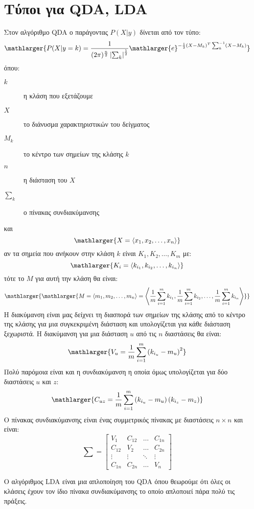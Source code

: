 \newpage
\section{Τύποι για \textlatin{QDA, LDA}}
Στον αλγόριθμο \textlatin{QDA} ο παράγοντας $P(X|y)$ δίνεται από τον τύπο:
$$\mathlarger{P(X|y=k)=\frac{1}{(2\pi)^\frac{n}{2}\left\lvert \sum_k\right\rvert^\frac{1}{2}}\mathlarger{e}^{-\frac{1}{2}(X-M_k)^T\sum_k^{-1}(X-M_k)}}$$
όπου:
\begin{description}
    \item[$k$] η κλάση που εξετάζουμε
    \item[$X$] το διάνυσμα χαρακτηριστικών του δείγματος
    \item[$M_k$] το κέντρο των σημείων της κλάσης $k$
    \item[$n$] η διάσταση του $X$
    \item[$\sum_k$] ο πίνακας συνδιακύμανσης
\end{description}
και
$$\mathlarger{X=\left\langle x_1,x_2,\dots,x_n\right\rangle}$$
αν τα σημεία που ανήκουν στην κλάση $k$ είναι $K_1,K_2,\dots,K_m$ με:
$$\mathlarger{K_i=\left\langle k_{i_1},k_{i_2},\dots,k_{i_n}\right\rangle}$$
τότε το $M$ για αυτή την κλάση θα είναι:
$$\mathlarger{\mathlarger{M=\left\langle m_1,m_2,\dots,m_n\right\rangle =\left\langle \frac{1}{m}\sum\limits_{i=1}^{m}k_{i_1},\frac{1}{m}\sum\limits_{i=1}^{m}k_{i_2},\dots,\frac{1}{m}\sum\limits_{i=1}^{m}k_{i_n}\right\rangle}}$$
Η διακύμανση είναι μας δείχνει τη διασπορά των σημείων της κλάσης από το κέντρο
της κλάσης για μια συγκεκριμένη διάσταση και υπολογίζεται για κάθε διάσταση
ξεχωριστά. Η διακύμανση για μια διάσταση $u$ από τις $n$ διαστάσεις θα είναι:
$$\mathlarger{V_u=\frac{1}{m}\sum\limits_{i=1}^{m}\left(k_{i_u}-m_u\right)^2}$$
Πολύ παρόμοια είναι και η συνδιακύμανση η οποία όμως υπολογίζεται για δύο
διαστάσεις $u$ και $z$:
$$\mathlarger{C_{uz}=\frac{1}{m}\sum\limits_{i=1}^{m}\left(k_{i_u}-m_u\right)\left(k_{i_z}-m_z\right)}$$
Ο πίνακας συνδιακύμανσης είναι ένας συμμετρικός πίνακας με διαστάσεις
$n\times n$ και είναι:
$$
\sum =
\begin{bmatrix}
    V_1 & C_{12} & \dots & C_{1n} \\
    C_{12} & V_2 & \dots & C_{2n} \\
    \vdots & \vdots & \ddots & \vdots \\
    C_{1n} & C_{2n} & \dots & V_n
\end{bmatrix}
$$

Ο αλγόριθμος \textlatin{LDA} είναι μια απλοποίηση του \textlatin{QDA} όπου
θεωρούμε ότι όλες οι κλάσεις έχουν τον ίδιο πίνακα συνδιακύμανσης το οποίο
απλοποιεί πάρα πολύ τις πράξεις.